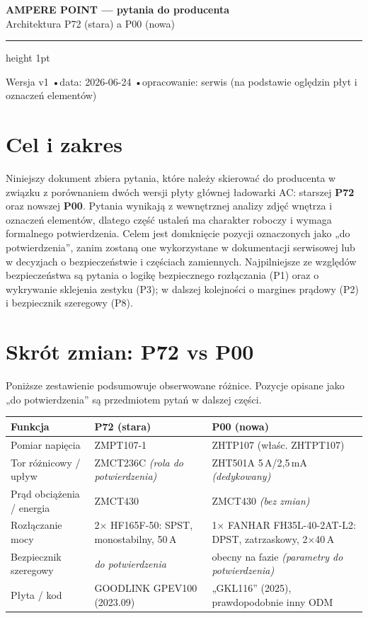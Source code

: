 \documentclass[11pt]{article}
\newcommand{\key}[1]{\textbf{\color{navy}#1}}
\begin{document}
{\sffamily\bfseries\color{navy}\LARGE AMPERE POINT — pytania do producenta}\\[3pt]
{\sffamily\large\color{navy} Architektura P72 (stara) a P00 (nowa)}\\[6pt]
{\color{rulegrey}\hrule height 1pt}\vspace{4pt}
{\footnotesize\sffamily Wersja v1 \quad•\quad data: 2026-06-24 \quad•\quad opracowanie: serwis (na podstawie oględzin płyt i oznaczeń elementów)}\\[2pt]

\section{Cel i zakres}

Niniejszy dokument zbiera pytania, które należy skierować do producenta w związku z porównaniem dwóch wersji płyty głównej ładowarki AC: starszej \key{P72} oraz nowszej \key{P00}. Pytania wynikają z wewnętrznej analizy zdjęć wnętrza i oznaczeń elementów, dlatego część ustaleń ma charakter roboczy i wymaga formalnego potwierdzenia. Celem jest domknięcie pozycji oznaczonych jako „do potwierdzenia'', zanim zostaną one wykorzystane w dokumentacji serwisowej lub w decyzjach o bezpieczeństwie i częściach zamiennych. Najpilniejsze ze względów bezpieczeństwa są pytania o logikę bezpiecznego rozłączania (P1) oraz o wykrywanie sklejenia zestyku (P3); w dalszej kolejności o margines prądowy (P2) i bezpiecznik szeregowy (P8).

\section{Skrót zmian: P72 vs P00}

Poniższe zestawienie podsumowuje obserwowane różnice. Pozycje opisane jako „do potwierdzenia'' są przedmiotem pytań w dalszej części.

\vspace{2pt}
\begin{tabularx}{\linewidth}{@{}p{4.3cm} X X@{}}
\toprule
\textbf{Funkcja} & \textbf{P72 (stara)} & \textbf{P00 (nowa)} \\
\midrule
Pomiar napięcia & ZMPT107-1 & ZHTP107 (właśc. ZHTPT107) \\
Tor różnicowy / upływ & ZMCT236C \emph{(rola do potwierdzenia)} & ZHT501A 5\,A/2,5\,mA \emph{(dedykowany)} \\
Prąd obciążenia / energia & ZMCT430 & ZMCT430 \emph{(bez zmian)} \\
Rozłączanie mocy & 2× HF165F-50: SPST, mono\-stabilny, 50\,A & 1× FANHAR FH35L-40-2AT-L2: DPST, zatrzaskowy, 2×40\,A \\
Bezpiecznik szeregowy & \emph{do potwierdzenia} & obecny na fazie \emph{(parametry do potwierdzenia)} \\
Płyta / kod & GOODLINK GPEV100 (2023.09) & „GKL116'' (2025), prawdopodobnie inny ODM \\
\bottomrule
\end{tabularx}
\end{document}
